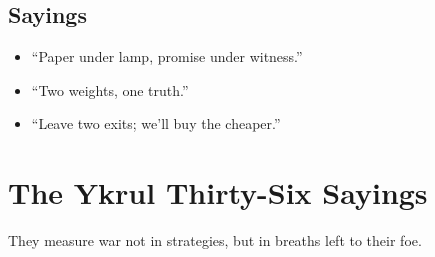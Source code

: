 \documentclass[11pt,letterpaper]{article}
\begin{document}
\subsection{Sayings}

\begin{itemize}
\item ``Paper under lamp, promise under witness.''
\item ``Two weights, one truth.''
\item ``Leave two exits; we'll buy the cheaper.''
\end{itemize}

\s
\appendix

\section{The Ykrul Thirty-Six Sayings}

They measure war not in strategies, but in breaths left to their foe.
\end{document}
